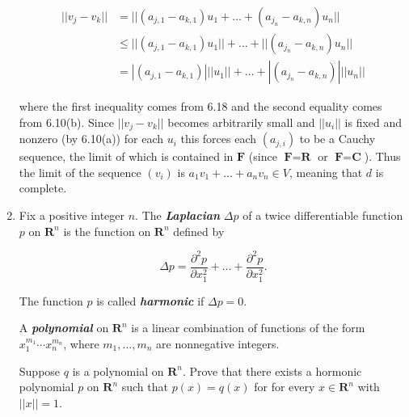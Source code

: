 \documentclass{book}
\begin{document}
\begin{enumerate}
\begin{equation*}
    \begin{split}
        ||v_j-v_k||&=||(a_{j,1}-a_{k,1})u_1+\dots+(a_{j_n}-a_{k,n})u_n|| \\
        & \leq ||(a_{j,1}-a_{k,1})u_1||+\dots+||(a_{j_n}-a_{k,n})u_n|| \\
        &= |(a_{j,1}-a_{k,1})|||u_1||+\dots+|(a_{j_n}-a_{k,n})|||u_n||
    \end{split}
\end{equation*}

where the first inequality comes from 6.18 and the second equality comes from 6.10(b).  Since \(||v_j-v_k||\) becomes arbitrarily small and \(||u_i||\) is fixed and nonzero (by 6.10(a)) for each \(u_i\) this forces each \((a_{j,i})\) to be a Cauchy sequence, the limit of which is contained in \(\textbf{F}\) (since \(\textbf{F}=\textbf{R}\) or \(\textbf{F}=\textbf{C}\)).  Thus the limit of the sequence \((v_i)\) is \(a_1v_1+\dots+a_nv_n \in V\), meaning that \(d\) is complete.


\item Fix a positive integer \(n\).  The \textbf{\textit{Laplacian}} \(\Delta p\) of a twice differentiable function \(p\) on \(\textbf{R}^n\) is the function on \(\textbf{R}^n\) defined by

\begin{equation*}
    \Delta p=\frac{\partial^2 p}{\partial x_1^2}+\dots+\frac{\partial^2 p}{\partial x_1^2}.
\end{equation*}

The function \(p\) is called \textbf{\textit{harmonic}} if \(\Delta p=0\).

A \textbf{\textit{polynomial}} on \(\textbf{R}^n\) is a linear combination of functions of the form \(x_1^{m_1} \cdots x_n^{m_n}\), where \(m_1,\dots,m_n\) are nonnegative integers.

Suppose \(q\) is a polynomial on \(\textbf{R}^n\).  Prove that there exists a hormonic polynomial \(p\) on \(\textbf{R}^n\) such that \(p(x)=q(x)\) for for every \(x \in \textbf{R}^n\) with \(||x||=1\).


\end{enumerate}
\end{document}
